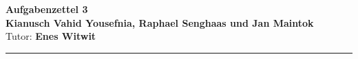 \begin{centering}
  \LARGE{\textbf{Aufgabenzettel 3}}\\
  \vspace*{20pt}
  \large{\textbf{Kianusch Vahid Yousefnia, Raphael Senghaas und Jan Maintok}}\\
  \large{Tutor: \textbf{Enes Witwit}}\\


 \end{centering}

 \vspace*{10pt}

 \rule{\textwidth}{1pt}

